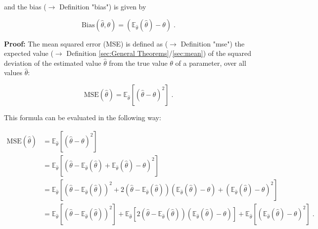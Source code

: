 \documentclass[a4paper,12pt,twoside]{book}
\begin{document}
and the bias ($\rightarrow$ Definition "bias") is given by

\begin{equation} \label{eq:mse-bnv-Bias}
\mathrm{Bias}(\hat{\theta},\theta) = \left( \mathbb{E}_{\hat{\theta}}(\hat{\theta}) - \theta \right) \; .
\end{equation}


\vspace{1em}
\textbf{Proof:} The mean squared error (MSE) is defined as ($\rightarrow$ Definition "mse") the expected value ($\rightarrow$ Definition \ref{sec:General Theorems}/\ref{sec:mean}) of the squared deviation of the estimated value $\hat{\theta}$ from the true value $\theta$ of a parameter, over all values $\hat{\theta}$:

\begin{equation} \label{eq:mse-bnv-MSE-def}
\mathrm{MSE}(\hat{\theta}) = \mathbb{E}_{\hat{\theta}}\left[ \left( \hat{\theta} - \theta \right)^2 \right] \; .
\end{equation}

This formula can be evaluated in the following way:

\begin{equation} \label{eq:mse-bnv-MSE-ref1}
\begin{split}
\mathrm{MSE}(\hat{\theta}) &= \mathbb{E}_{\hat{\theta}}\left[ \left( \hat{\theta} - \theta \right)^2 \right] \\
&= \mathbb{E}_{\hat{\theta}}\left[ \left( \hat{\theta} - \mathbb{E}_{\hat{\theta}}(\hat{\theta}) + \mathbb{E}_{\hat{\theta}}(\hat{\theta}) - \theta \right)^2 \right] \\
&= \mathbb{E}_{\hat{\theta}}\left[ \left( \hat{\theta} - \mathbb{E}_{\hat{\theta}}(\hat{\theta}) \right)^2 + 2 \left( \hat{\theta} - \mathbb{E}_{\hat{\theta}}(\hat{\theta}) \right) \left( \mathbb{E}_{\hat{\theta}}(\hat{\theta}) - \theta \right) + \left( \mathbb{E}_{\hat{\theta}}(\hat{\theta}) - \theta \right)^2 \right] \\
&= \mathbb{E}_{\hat{\theta}}\left[ \left( \hat{\theta} - \mathbb{E}_{\hat{\theta}}(\hat{\theta}) \right)^2 \right] + \mathbb{E}_{\hat{\theta}}\left[ 2 \left( \hat{\theta} - \mathbb{E}_{\hat{\theta}}(\hat{\theta}) \right) \left( \mathbb{E}_{\hat{\theta}}(\hat{\theta}) - \theta \right) \right] + \mathbb{E}_{\hat{\theta}}\left[ \left( \mathbb{E}_{\hat{\theta}}(\hat{\theta}) - \theta \right)^2 \right] \; . \\
\end{split}
\end{equation}
\end{document}
